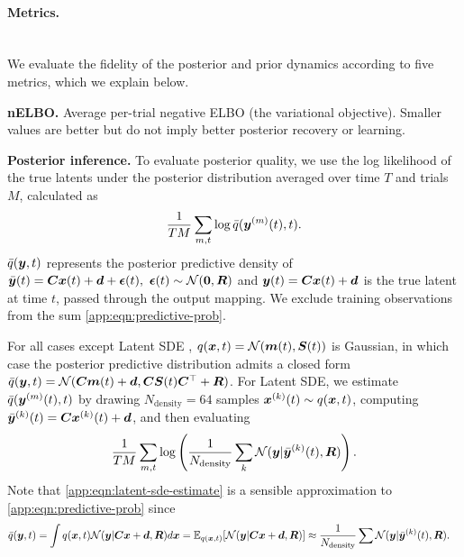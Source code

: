 \paragraph{Metrics.}\leavevmode\\

We evaluate the fidelity of the posterior and prior dynamics according to five metrics, which we explain below.

\textbf{nELBO.} Average per-trial negative ELBO (the variational objective). Smaller values are better but do not imply better posterior recovery or learning.

\textbf{Posterior inference.}
To evaluate posterior quality, we use the log likelihood of the true latents  under the posterior distribution averaged over time $T$ and trials $M$, calculated as 
\begin{equation}\label{app:eqn:predictive-prob}
   \frac{1}{TM} \sum_{m, t} \log 
\bar{q}(\boldsymbol{y}^{(m)}(t), t).
\end{equation}
$\bar{q}(\boldsymbol{y}, t)$ represents the posterior predictive density of  $\bar{\boldsymbol{y}}(t) = \boldsymbol{C} \boldsymbol{x}(t) + \boldsymbol{d} + \boldsymbol{\epsilon}(t), \ \boldsymbol{\epsilon}(t) \sim \mathcal{N}(\boldsymbol{0}, \boldsymbol{R})$ and $\boldsymbol{y}(t) = \boldsymbol{C} \boldsymbol{x}(t) + \boldsymbol{d}$ is the true latent at time $t$, passed through the output mapping. 
We exclude training observations from the sum \cref{app:eqn:predictive-prob}.


For all cases except Latent SDE \cite{li2020scalable}, $q(\boldsymbol{x}, t) = \mathcal{N}(\boldsymbol{m}(t), \boldsymbol{S}(t))$ is Gaussian, in which case  the posterior predictive distribution admits a closed form $\bar{q}(\boldsymbol{y}, t) = \mathcal{N}(\boldsymbol{C} \boldsymbol{m}(t) + \boldsymbol{d}, \boldsymbol{C} \boldsymbol{S}(t) \boldsymbol{C}^\top + \boldsymbol{R})$.
For Latent SDE, we estimate $\bar{q}(\boldsymbol{y}^{(m)}(t), t)$ by drawing $N_{\mathrm{density}} = 64$ samples $\boldsymbol{x}^{(k)}(t) \sim q(\boldsymbol{x}, t)$, computing $\bar{\boldsymbol{y}}^{(k)}(t) =  \boldsymbol{C} \boldsymbol{x}^{(k)}(t) + \boldsymbol{d}$, and then evaluating
\begin{equation}\label{app:eqn:latent-sde-estimate}
    \frac{1}{TM} \sum_{m, t} \log \left(\frac{1}{N_{\mathrm{density}}} \sum_k \mathcal{N}(\boldsymbol{y} | \bar{\boldsymbol{y}}^{(k)}(t), \boldsymbol{R}) \right).
\end{equation}
Note that \cref{app:eqn:latent-sde-estimate} is a sensible approximation to \cref{app:eqn:predictive-prob} since
{\small
\begin{equation*}
\begin{aligned}
    \bar{q}(\boldsymbol{y}, t) &= \int q(\boldsymbol{x}, t) \mathcal{N}(\boldsymbol{y} | \boldsymbol{C} \boldsymbol{x} + \boldsymbol{d}, \boldsymbol{R}) d \boldsymbol{x}
    = \mathbb{E}_{q(\boldsymbol{x}, t)}[\mathcal{N}(\boldsymbol{y} | \boldsymbol{C} \boldsymbol{x} + \boldsymbol{d}, \boldsymbol{R})] \approx \frac{1}{N_{\mathrm{density}}} \sum \mathcal{N}(\boldsymbol{y} | \bar{\boldsymbol{y}}^{(k)}(t), \boldsymbol{R}).
\end{aligned}
\end{equation*}
}

